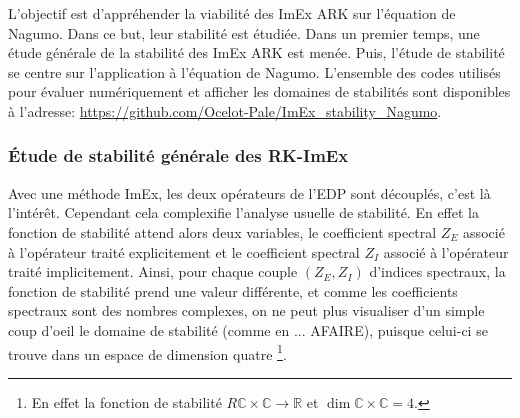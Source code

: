 L'objectif est d'appréhender la viabilité des ImEx ARK sur l'équation de Nagumo. Dans ce but, leur stabilité est étudiée.
Dans un premier temps, une étude générale de la stabilité des ImEx ARK est menée.
Puis, l'étude de stabilité se centre sur l'application à l'équation de Nagumo. L'ensemble des codes utilisés pour évaluer numériquement et afficher les domaines de stabilités
sont disponibles à l'adresse: \href{https://github.com/Ocelot-Pale/ImEx_stability_Nagumo}{https://github.com/Ocelot-Pale/ImEx\_stability\_Nagumo}.



\subsubsection{Étude de stabilité générale des RK-ImEx}
    Avec une méthode ImEx, les deux opérateurs de l'EDP sont découplés, c'est là l'intérêt.
    Cependant cela complexifie l'analyse usuelle de stabilité. 
    En effet la fonction de stabilité attend alors deux variables, %
    le coefficient spectral $Z_E$ associé à l'opérateur traité explicitement et
    le coefficient spectral $Z_I$ associé à l'opérateur traité implicitement.
    Ainsi, pour chaque couple $(Z_E,Z_I)$ d'indices spectraux, la fonction de stabilité prend une valeur différente, et comme les coefficients spectraux sont des nombres complexes, 
    on ne peut plus visualiser d'un simple coup d'oeil le domaine de stabilité (comme en ... AFAIRE), puisque celui-ci se trouve dans un espace de dimension quatre
    \footnote{En effet la fonction de stabilité $R \mathbb C \times \mathbb C \rightarrow \mathbb R$ et $\dim  \mathbb C \times \mathbb C=4$.}.
